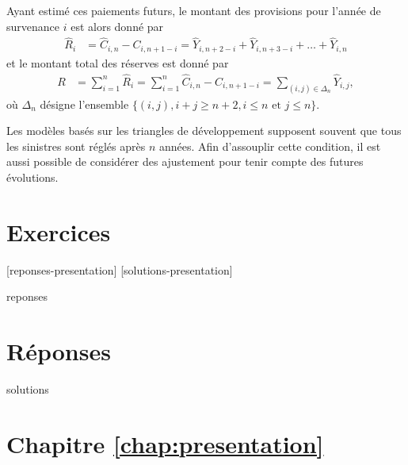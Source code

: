 Ayant estimé ces paiements futurs, le montant des provisions pour
l'année de survenance $i$ est alors donné par
\begin{align*}
  \hat{R}_i &= \hat{C}_{i,n} - C_{i, n+1-i} =
                  \hat{Y}_{i,n+2-i} + \hat{Y}_{i,n+3-i} + \dots +
                  \hat{Y}_{i,n}
\end{align*}
et le montant total des réserves est donné par
\begin{align*}
R &= \sum_{i=1}^n \hat{R}_i = \sum_{i=1}^n \hat{C}_{i,n} -
C_{i, n+1-i} = \sum_{(i,j) \in \Delta_n } \hat{Y}_{i,j},
\end{align*}
où $\Delta_n$ désigne l'ensemble
$\{(i,j), i+j \ge n+2, i \le n \text{ et } j \le n \}$.

Les modèles basés sur les triangles de développement supposent souvent
que tous les sinistres sont réglés après $n$ années. Afin d'assouplir
cette condition, il est aussi possible de considérer des ajustement
pour tenir compte des futures évolutions.


\section{Exercices}
\label{sec:presentation:exercices}

[reponses-presentation]
[solutions-presentation]

\begin{Filesave}{reponses}
\bigskip
\section*{Réponses}

\end{Filesave}

\begin{Filesave}{solutions}
\section*{Chapitre \ref*{chap:presentation}}

\end{Filesave}

